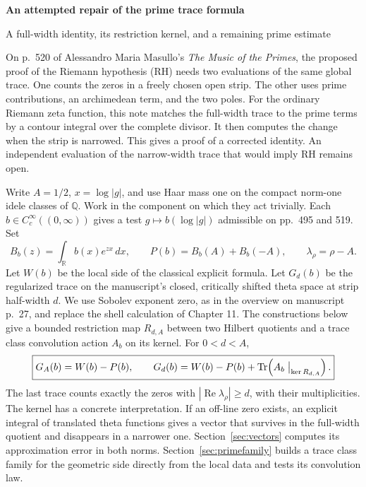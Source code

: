 \documentclass[11pt,letterpaper]{article}
\newcommand{\R}{\mathbb R}\newcommand{\Q}{\mathbb Q}\newcommand{\C}{\mathbb C}
\newcommand{\re}{\operatorname{Re}}\newcommand{\im}{\operatorname{Im}}
\newcommand{\Tr}{\operatorname{Tr}}\newcommand{\supp}{\operatorname{supp}}
\newcommand{\dd}{\,d}\newcommand{\id}{\mathrm{Id}}
\newcommand{\step}[1]{\par\smallskip{\color{ink}\bfseries #1}\enspace}
\begin{document}
\thispagestyle{plain}
{\color{ink}\LARGE\bfseries An attempted repair of the prime trace formula\par}
\smallskip
{\large A full-width identity, its restriction kernel, and a remaining prime estimate\par}
\medskip

On p.~520 of Alessandro Maria Masullo's \emph{The Music of the Primes}, the proposed proof of the Riemann hypothesis (RH) needs two evaluations of the same global trace. One counts the zeros in a freely chosen open strip. The other uses prime contributions, an archimedean term, and the two poles. For the ordinary Riemann zeta function, this note matches the full-width trace to the prime terms by a contour integral over the complete divisor. It then computes the change when the strip is narrowed. This gives a proof of a corrected identity. An independent evaluation of the narrow-width trace that would imply RH remains open.

\step{The corrected formula.}
Write \(A=1/2\), \(x=\log |g|\), and use Haar mass one on the compact norm-one idele classes of \(\Q\). Work in the component on which they act trivially. Each \(b\in C_c^\infty((0,\infty))\) gives a test \(g\mapsto b(\log|g|)\) admissible on pp.~495 and 519. Set
\[
 B_b(z)=\int_\R b(x)e^{zx}\dd x,\qquad P(b)=B_b(A)+B_b(-A),
 \qquad \lambda_\rho=\rho-A .
\]
Let \(W(b)\) be the local side of the classical explicit formula. Let \(G_d(b)\) be the regularized trace on the manuscript's closed, critically shifted theta space at strip half-width \(d\). We use Sobolev exponent zero, as in the overview on manuscript p.~27, and replace the shell calculation of Chapter 11. The constructions below give a bounded restriction map \(R_{d,A}\) between two Hilbert quotients and a trace class convolution action \(A_b\) on its kernel. For \(0<d<A\),
\begin{equation}
 \boxed{\displaystyle
   G_A(b)=W(b)-P(b),\qquad
   G_d(b)=W(b)-P(b)+\Tr\!\left(A_b\bigm|_{\ker R_{d,A}}\right).}
 \label{eq:main}
\end{equation}
The last trace counts exactly the zeros with \(|\re\lambda_\rho|\ge d\), with their multiplicities. The kernel has a concrete interpretation. If an off-line zero exists, an explicit integral of translated theta functions gives a vector that survives in the full-width quotient and disappears in a narrower one. Section~\ref{sec:vectors} computes its approximation error in both norms. Section~\ref{sec:primefamily} builds a trace class family for the geometric side directly from the local data and tests its convolution law.
\end{document}

